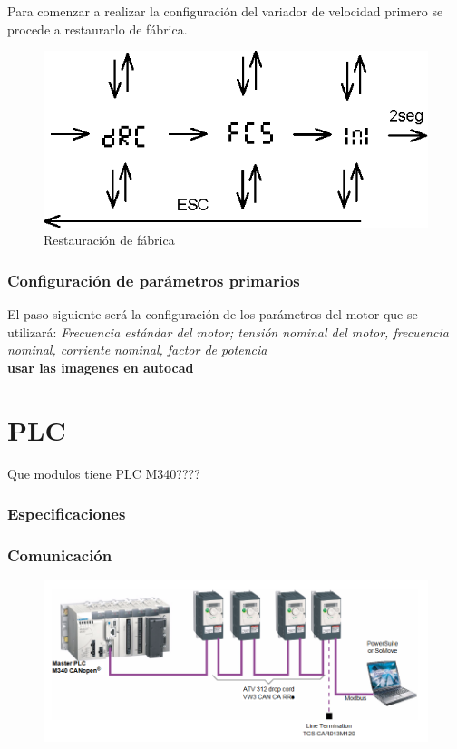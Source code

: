 \documentclass[12pt,a4paper]{article}
\begin{document}
	Para comenzar a realizar la configuración del variador de velocidad primero se procede a restaurarlo de fábrica.
			
			\begin{figure}[h!]
			\centering
			\includegraphics[scale=1]{ver1.eps}
			\caption{Restauración de fábrica}
			\end{figure}

	\section{Configuración de parámetros primarios}
	El paso siguiente será la configuración de los parámetros del motor que se utilizará: \textsl{Frecuencia estándar del motor; tensión nominal del motor, frecuencia nominal, corriente nominal, factor de potencia}\\
	\textbf{usar las imagenes en autocad}
	
		
\newpage
	
	\part{PLC}
	
	Que modulos tiene PLC M340????
	\section{Especificaciones}
	\section{Comunicación}
	\begin{figure}[htb]
		\centering
		\includegraphics[scale=0.7]{comu.png}
	\end{figure}
\newpage
\end{document}
